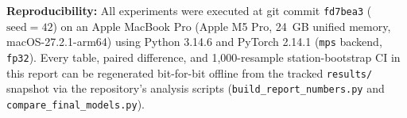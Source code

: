 \documentclass[conference]{IEEEtran}
\begin{document}
\textbf{Reproducibility:} All experiments were executed at git commit
\texttt{fd7bea3} ($\text{seed} = 42$) on an Apple MacBook Pro (Apple M5 Pro,
24~GB unified memory, macOS-27.2.1-arm64) using Python 3.14.6 and PyTorch 2.14.1
(\texttt{mps} backend, \texttt{fp32}). Every table, paired difference, and
1,000-resample station-bootstrap CI in this report can be regenerated
bit-for-bit offline from the tracked \texttt{results/} snapshot via the
repository's analysis scripts (\texttt{build\_report\_numbers.py} and
\texttt{compare\_final\_models.py}).



\end{document}
